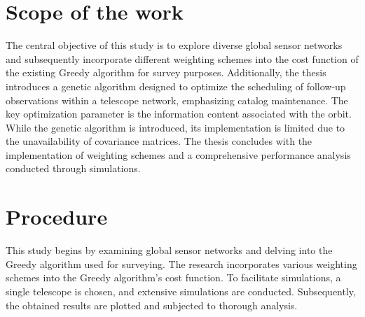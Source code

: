 \section{Scope of the work}

The central objective of this study is to explore diverse global sensor networks and subsequently incorporate different weighting schemes into the cost function of the existing Greedy algorithm for survey purposes. Additionally, the thesis introduces a genetic algorithm designed to optimize the scheduling of follow-up observations within a telescope network, emphasizing catalog maintenance. 
The key optimization parameter is the information content associated with the orbit. While the genetic algorithm is introduced, its implementation is limited due to the unavailability of covariance matrices. The thesis concludes with the implementation of weighting schemes and a comprehensive performance analysis conducted through simulations.

\section{Procedure}
This study begins by examining global sensor networks and delving into the Greedy algorithm used for surveying. The research incorporates various weighting schemes into the Greedy algorithm's cost function. 
To facilitate simulations, a single telescope is chosen, and extensive simulations are conducted. Subsequently, the obtained results are plotted and subjected to thorough analysis.
